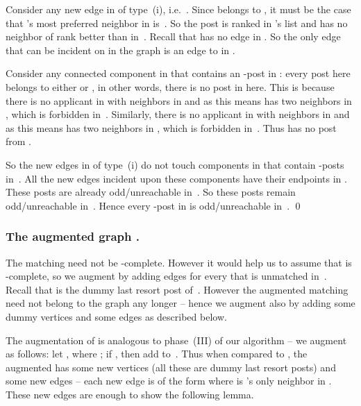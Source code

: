 \documentclass[11pt]{llncs}
\begin{document}
Consider any new edge  in  of type~(i), 
i.e.\ . Since  belongs to , it must be 
the case that 's most preferred neighbor in  is~. So the post  is
ranked  in 's list and  has no neighbor of rank better than  in~. 
Recall that  has no edge in  . So the only edge that can be incident 
on  in the graph  is an edge to  in . 

Consider any connected component  in  that contains an -post in : every post 
here belongs to either  or , in other words, there is no post in 
 here. This is because there is no applicant  in  with neighbors in 
 and   as this means  has two neighbors in , which  is 
forbidden in~. 
Similarly, there is no applicant  in  with neighbors in  and 
 as this means  has two neighbors in , which  is forbidden in~. 
Thus  has no post from .

So the new edges in  of type~(i) do not touch components in  that contain -posts 
in~. All the new edges incident upon these components have their endpoints in 
. These posts  are already odd/unreachable in~. So these posts 
remain  odd/unreachable in~. Hence every -post in  is odd/unreachable in~. \qed




\subsubsection*{The augmented graph .}
The matching  need not be -complete. However it would help us to assume that  is 
-complete, so we augment  by adding  edges for every  that
is unmatched in~. Recall that  is the dummy last resort post of~.
However the augmented matching  need not belong to the graph  any longer -- hence
we augment  also by adding some dummy vertices and some edges as described below. 

The augmentation of  is analogous to phase~(III) of our algorithm -- we augment  as
follows: let , where ;
if , then add  to~. Thus when compared to , 
the augmented  has some new vertices (all these are dummy last resort posts) and 
some new edges -- each new edge is of the form  where  is 's only
neighbor in .
These new edges are enough to show the following lemma.
\end{document}
